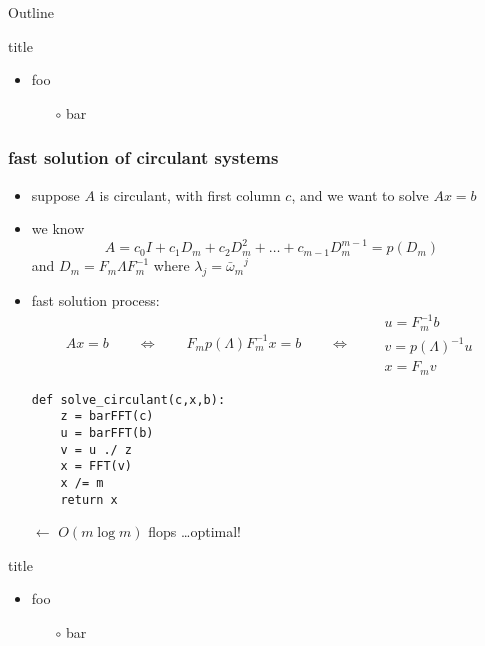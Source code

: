 \documentclass[10pt,
               svgnames,
               hyperref={colorlinks,citecolor=DeepPink4,linkcolor=FireBrick,urlcolor=Maroon},
               usepdftitle=false]{beamer}
\begin{document}
\begin{frame}{Outline}
\end{frame}

\begin{frame}{title}

\begin{itemize}
\item foo
   \begin{itemize}
   \item[$\circ$] bar
   \end{itemize}
\end{itemize}
\end{frame}



\begin{frame}[fragile]
\frametitle{fast solution of circulant systems}

\begin{itemize}
\item suppose $A$ is circulant, with first column $c$, and we want to solve $Ax=b$
\item we know
  $$A = c_0 I + c_1 D_m + c_2 D_m^2 + \dots + c_{m-1} D_m^{m-1} = p(D_m)$$
and $D_m = F_m \Lambda F_m^{-1}$ where $\lambda_j = {\bar\omega_m}^j$
\item fast solution process:
    $$Ax = b \qquad \iff \qquad F_m p(\Lambda) F_m^{-1} x = b \qquad \iff \qquad \begin{matrix} u = F_m^{-1} b \\ v = p(\Lambda)^{-1} u \\ x = F_m v \end{matrix}$$ 

\begin{verbatim}
def solve_circulant(c,x,b):
    z = barFFT(c)
    u = barFFT(b)
    v = u ./ z
    x = FFT(v)
    x /= m
    return x
\end{verbatim}

\vspace{-20mm}
\hfill $\gets$ \quad $O(m\log m)$ flops \dots optimal!

\vspace{15mm}
\end{itemize}
\end{frame}


\begin{frame}{title}

\begin{itemize}
\item foo
   \begin{itemize}
   \item[$\circ$] bar
   \end{itemize}
\end{itemize}
\end{frame}
\end{document}
